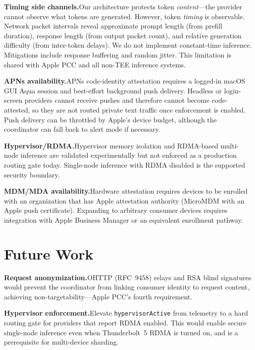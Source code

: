 \documentclass[10pt,twocolumn,letterpaper]{article}
\begin{document}
\textbf{Timing side channels.}\quad Our architecture protects token \emph{content}---the provider cannot observe what tokens are generated. However, token \emph{timing} is observable. Network packet intervals reveal approximate prompt length (from prefill duration), response length (from output packet count), and relative generation difficulty (from inter-token delays). We do not implement constant-time inference. Mitigations include response buffering and random jitter. This limitation is shared with Apple PCC and all non-TEE inference systems.

\textbf{APNs availability.}\quad APNs code-identity attestation requires a logged-in macOS GUI Aqua session and best-effort background push delivery. Headless or login-screen providers cannot receive pushes and therefore cannot become code-attested, so they are not routed private text traffic once enforcement is enabled. Push delivery can be throttled by Apple's device budget, although the coordinator can fall back to alert mode if necessary.

\textbf{Hypervisor/RDMA.}\quad Hypervisor memory isolation and RDMA-based multi-node inference are validated experimentally but not enforced as a production routing gate today. Single-node inference with RDMA disabled is the supported security boundary.

\textbf{MDM/MDA availability.}\quad Hardware attestation requires devices to be enrolled with an organization that has Apple attestation authority (MicroMDM with an Apple push certificate). Expanding to arbitrary consumer devices requires integration with Apple Business Manager or an equivalent enrollment pathway.

\section{Future Work}
\label{sec:future}

\textbf{Request anonymization.}\quad OHTTP (RFC~9458) relays and RSA blind signatures would prevent the coordinator from linking consumer identity to request content, achieving non-targetability---Apple PCC's fourth requirement.

\textbf{Hypervisor enforcement.}\quad Elevate \texttt{hypervisorActive} from telemetry to a hard routing gate for providers that report RDMA enabled. This would enable secure single-node inference even when Thunderbolt~5 RDMA is turned on, and is a prerequisite for multi-device sharding.
\end{document}
